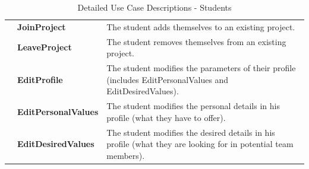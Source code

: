 \documentclass[12pt,letterpaper]{article}
\begin{document}
\begin{table}[H]
\caption{Detailed Use Case Descriptions - Students}
\vspace{1em}
\begin{tabu} to 
	\joinproject{} & JoinProject & The student adds themselves to an existing project.\\
	\leaveproject{} & LeaveProject & The student removes themselves from an existing project.\\
	\editprofile{} & EditProfile & The student modifies the parameters of their profile (includes EditPersonalValues and EditDesiredValues).\\
	\editpersonalvalues{} & EditPersonalValues & The student modifies the personal details in his profile (what they have to offer). \\
	\editdesiredvalues{} & EditDesiredValues & The student modifies the desired details in his profile (what they are looking for in potential team members). \\
\end{tabu}
\end{table}
\end{document}
